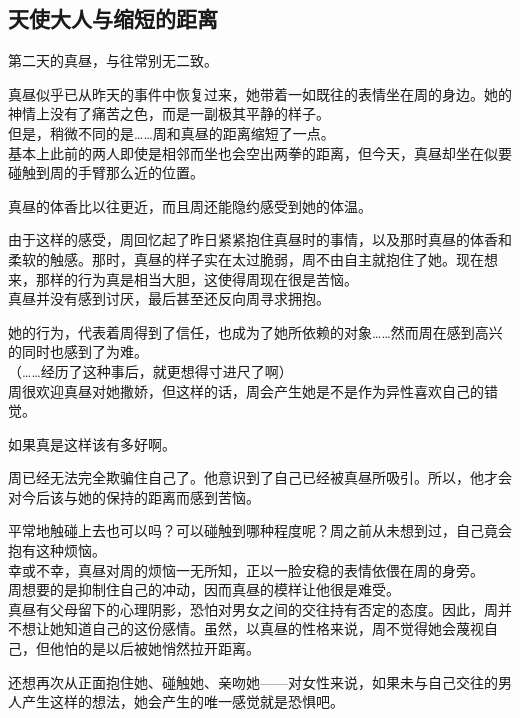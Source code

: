 \subsection{天使大人与缩短的距离}

第二天的真昼，与往常别无二致。

真昼似乎已从昨天的事件中恢复过来，她带着一如既往的表情坐在周的身边。她的神情上没有了痛苦之色，而是一副极其平静的样子。\\

但是，稍微不同的是……周和真昼的距离缩短了一点。\\

基本上此前的两人即使是相邻而坐也会空出两拳的距离，但今天，真昼却坐在似要碰触到周的手臂那么近的位置。

真昼的体香比以往更近，而且周还能隐约感受到她的体温。

由于这样的感受，周回忆起了昨日紧紧抱住真昼时的事情，以及那时真昼的体香和柔软的触感。那时，真昼的样子实在太过脆弱，周不由自主就抱住了她。现在想来，那样的行为真是相当大胆，这使得周现在很是苦恼。\\

真昼并没有感到讨厌，最后甚至还反向周寻求拥抱。

她的行为，代表着周得到了信任，也成为了她所依赖的对象……然而周在感到高兴的同时也感到了为难。\\

（……经历了这种事后，就更想得寸进尺了啊）\\

周很欢迎真昼对她撒娇，但这样的话，周会产生她是不是作为异性喜欢自己的错觉。

如果真是这样该有多好啊。

周已经无法完全欺骗住自己了。他意识到了自己已经被真昼所吸引。所以，他才会对今后该与她的保持的距离而感到苦恼。

平常地触碰上去也可以吗？可以碰触到哪种程度呢？周之前从未想到过，自己竟会抱有这种烦恼。\\

幸或不幸，真昼对周的烦恼一无所知，正以一脸安稳的表情依偎在周的身旁。\\

周想要的是抑制住自己的冲动，因而真昼的模样让他很是难受。\\

真昼有父母留下的心理阴影，恐怕对男女之间的交往持有否定的态度。因此，周并不想让她知道自己的这份感情。虽然，以真昼的性格来说，周不觉得她会蔑视自己，但他怕的是以后被她悄然拉开距离。

还想再次从正面抱住她、碰触她、亲吻她——对女性来说，如果未与自己交往的男人产生这样的想法，她会产生的唯一感觉就是恐惧吧。\\

